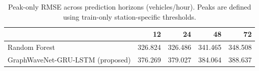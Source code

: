 \begin{table}
\caption{Peak-only RMSE across prediction horizons (vehicles/hour). Peaks are defined using train-only station-specific thresholds.}
\label{tab:peak_rmse}
\begin{tabular}{lrrrr}
\toprule
 & 12 & 24 & 48 & 72 \\
\midrule
Random Forest & 326.824 & 326.486 & 341.465 & 348.508 \\
GraphWaveNet-GRU-LSTM (proposed) & 376.269 & 379.027 & 384.064 & 388.637 \\
\bottomrule
\end{tabular}
\end{table}
